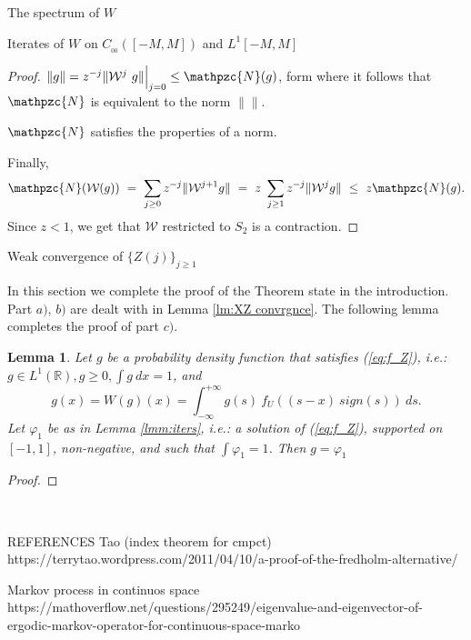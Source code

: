 \documentclass[12pt]{article}
\newtheorem*{lmm}{Lemma}
\begin{document}
\begin{section}{The spectrum of $W$ }
\begin{subsection}{Iterates of $W$ on $C_{_{0\!0}}([-M,M])$ and $L^1[-M,M]$ }
\begin{proof}
$\| g \| = z^{-j} \| \mathcal{W}^j \ g\| \Big|_{j=0} \le \mathpzc{N}(g)$, form where it follows that $\mathpzc{N}$ is equivalent to the norm $\| \|$.  

$\mathpzc{N}$ satisfies the properties of a norm.   

Finally,
$$
\mathpzc{N}(\mathcal{W}(g)) 
~=~ \sum_{j \ge 0} z^{-j} \| \mathcal{W}^{j+1} g\|
~=~ z \ \sum_{j \ge 1} z^{-j} \| \mathcal{W}^{j} g\|
~\le~ z \mathpzc{N}(g).
$$
Since $ z < 1$, we get that $\mathcal{W}$ restricted to $S_2$ is a contraction.  
\end{proof}
	
	
\end{subsection}


		
\end{section}



\begin{section}{Weak convergence of $\{Z(j)\}_{j \ge 1}$ }

In this section we complete the proof of the Theorem state in the introduction. Part $a)$, $b)$ are dealt with in Lemma \ref{lm:XZ convrgnce}. The following lemma completes the proof of part $c)$.  

   
\begin{lmm} Let $g$ be a probability density function that satisfies (\ref{eq:f_Z}), i.e.: $g \in L^1(\mathbb{R}), g \ge 0, \int g \ dx = 1$, and 
	\begin{equation} \label{inL1}
	g(x) = W(g)(x) = \int_{-\infty}^{+\infty} g(s)\ f_U\!\left(  \left(s - x \right)\ sign(s) \right) \ ds.
	\end{equation}
Let $\varphi_1$ be as in Lemma \ref{lmm:iters}, i.e.: a solution of (\ref{eq:f_Z}), supported on $[-1,1]$, non-negative, and such that $\int \varphi_1 =1$. Then $g = \varphi_1$  
\end{lmm}

\begin{proof}

\end{proof}	
	
\end{section}



\  
  

REFERENCES
Tao (index theorem for cmpct)
https://terrytao.wordpress.com/2011/04/10/a-proof-of-the-fredholm-alternative/

Markov process in continuos space
https://mathoverflow.net/questions/295249/eigenvalue-and-eigenvector-of-ergodic-markov-operator-for-continuous-space-marko
\end{document}
